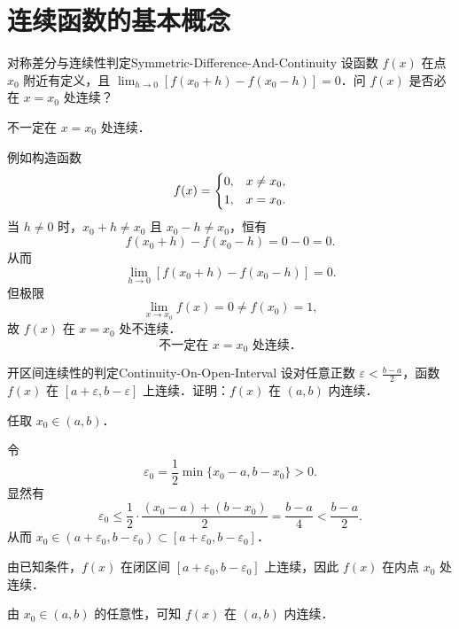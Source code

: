 \section{连续函数的基本概念}

\begin{problem}{对称差分与连续性判定}{Symmetric-Difference-And-Continuity}
    设函数 $f(x)$ 在点 $x_0$ 附近有定义，且 $\lim_{h\to 0}[f(x_0+h)-f(x_0-h)]=0$．问 $f(x)$ 是否必在 $x = x_0$ 处连续？
\end{problem}

\begin{solution}
    不一定在 $x = x_0$ 处连续．

    例如构造函数
    \begin{equation}
        f(x) = \begin{dcases} 0, & x \neq x_0, \\ 1, & x = x_0. \end{dcases}
    \end{equation}
    当 $h \neq 0$ 时，$x_0 + h \neq x_0$ 且 $x_0 - h \neq x_0$，恒有
    \begin{equation}
        f(x_0 + h) - f(x_0 - h) = 0 - 0 = 0.
    \end{equation}
    从而
    \begin{equation}
        \lim_{h\to 0} [f(x_0 + h) - f(x_0 - h)] = 0.
    \end{equation}
    但极限
    \begin{equation}
        \lim_{x\to x_0} f(x) = 0 \neq f(x_0) = 1,
    \end{equation}
    故 $f(x)$ 在 $x = x_0$ 处不连续．
    \begin{equation}
        \boxed{\text{不一定在 } x = x_0 \text{ 处连续．}}
    \end{equation}
\end{solution}

\begin{problem}{开区间连续性的判定}{Continuity-On-Open-Interval}
    设对任意正数 $\varepsilon < \frac{b-a}{2}$，函数 $f(x)$ 在 $[a+\varepsilon, b-\varepsilon]$ 上连续．证明：$f(x)$ 在 $(a, b)$ 内连续．
\end{problem}

\begin{myproof}
    任取 $x_0 \in (a, b)$．

    令
    \begin{equation}
        \varepsilon_0 = \frac{1}{2} \min\{ x_0 - a, b - x_0 \} > 0.
    \end{equation}
    显然有
    \begin{equation}
        \varepsilon_0 \leqslant \frac{1}{2} \cdot \frac{(x_0 - a) + (b - x_0)}{2} = \frac{b-a}{4} < \frac{b-a}{2}.
    \end{equation}
    从而 $x_0 \in (a + \varepsilon_0, b - \varepsilon_0) \subset [a + \varepsilon_0, b - \varepsilon_0]$．

    由已知条件，$f(x)$ 在闭区间 $[a + \varepsilon_0, b - \varepsilon_0]$ 上连续，因此 $f(x)$ 在内点 $x_0$ 处连续．

    由 $x_0 \in (a, b)$ 的任意性，可知 $f(x)$ 在 $(a, b)$ 内连续．
\end{myproof}

